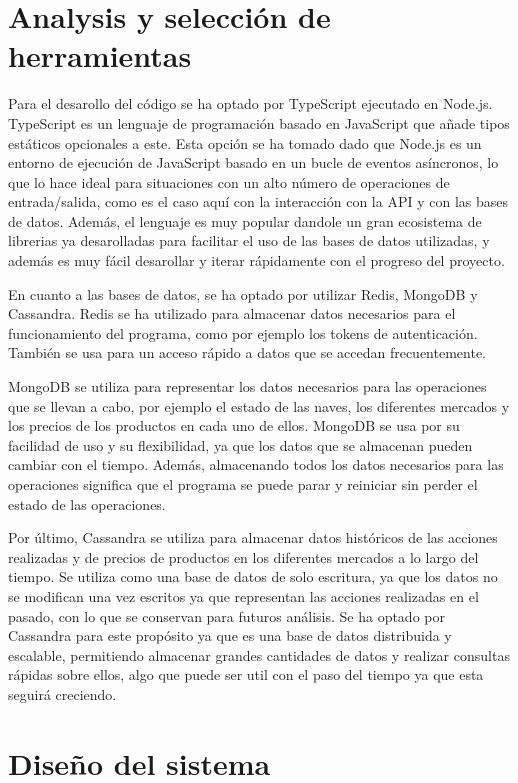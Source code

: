 \documentclass[spanish]{article}
\begin{document}
\section{Analysis y selección de herramientas}

Para el desarollo del código se ha optado por TypeScript ejecutado en Node.js.
TypeScript es un lenguaje de programación basado en JavaScript que añade tipos estáticos opcionales a este.
Esta opción se ha tomado dado que Node.js es un entorno de ejecución de JavaScript basado en un
bucle de eventos asíncronos, lo que lo hace ideal para situaciones con un alto número de operaciones de entrada/salida, como es el caso aquí
con la interacción con la API y con las bases de datos.
Además, el lenguaje es muy popular dandole un gran ecosistema de librerias ya desarolladas para facilitar el uso de las bases de datos utilizadas,
y además es muy fácil desarollar y iterar rápidamente con el progreso del proyecto.

En cuanto a las bases de datos, se ha optado por utilizar Redis, MongoDB y Cassandra.
Redis se ha utilizado para almacenar datos necesarios para el funcionamiento del programa, como por ejemplo los tokens de autenticación.
También se usa para un acceso rápido a datos que se accedan frecuentemente.

MongoDB se utiliza para representar los datos necesarios para las operaciones que se llevan a cabo, por ejemplo el estado de las naves,
los diferentes mercados y los precios de los productos en cada uno de ellos.
MongoDB se usa por su facilidad de uso y su flexibilidad, ya que los datos que se almacenan pueden cambiar con el tiempo.
Además, almacenando todos los datos necesarios para las operaciones significa que el programa
se puede parar y reiniciar sin perder el estado de las operaciones.

Por último, Cassandra se utiliza para almacenar datos históricos de las acciones realizadas y
de precios de productos en los diferentes mercados a lo largo del tiempo.
Se utiliza como una base de datos de solo escritura, ya que los datos no se modifican una vez escritos
ya que representan las acciones realizadas en el pasado, con lo que se conservan para futuros análisis.
Se ha optado por Cassandra para este propósito ya que es una base de datos distribuida y escalable,
permitiendo almacenar grandes cantidades de datos y realizar consultas rápidas sobre ellos,
algo que puede ser util con el paso del tiempo ya que esta seguirá creciendo.

\section{Diseño del sistema}
\end{document}
